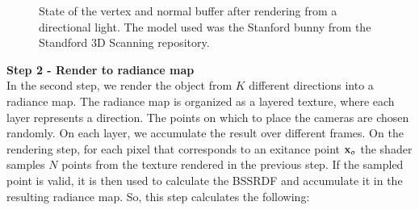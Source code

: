 \begin{figure}
\centering
{}
\label{fig:lightbuffers}
\caption{State of the vertex and normal buffer after rendering from a directional light. The model used was the Stanford bunny from the Standford 3D Scanning repository.}
\end{figure}



\textbf{Step 2 - Render to radiance map} \\
In the second step, we render the object from $K$ different directions into a radiance map. The radiance map is organized as a layered texture, where each layer represents a direction. The points on which to place the cameras are chosen randomly. On each layer, we accumulate the result over different frames. On the rendering step, for each pixel that corresponds to an exitance point $\mathbf{x}_o$ the shader samples $N$ points from the texture rendered in the previous step. If the sampled point is valid, it is then used to calculate the BSSRDF and accumulate it in the resulting radiance map. So, this step calculates the following:

